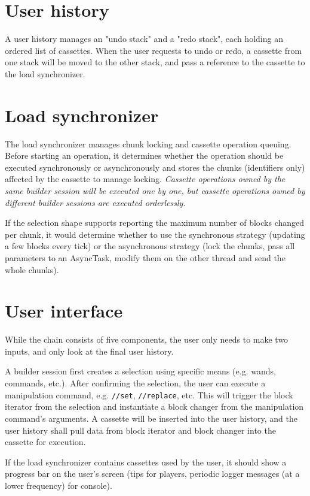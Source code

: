 \documentclass{article}
\begin{document}
			\section{User history}
				A user history manages an "undo stack" and a "redo stack", each holding an ordered list of cassettes.
				When the user requests to undo or redo, a cassette from one stack will be moved to the other stack, and
				pass a reference to the cassette to the load synchronizer.

			\section{Load synchronizer}
				The load synchronizer manages chunk locking and cassette operation queuing. Before starting an
				operation, it determines whether the operation should be executed synchronously or asynchronously and
				stores the chunks (identifiers only) affected by the cassette to manage locking. \emph{Cassette
				operations owned by the same builder session will be executed one by one, but cassette operations owned
				by different builder sessions are executed orderlessly.}

				If the selection shape supports reporting the maximum number of blocks changed per chunk, it would
				determine whether to use the synchronous strategy (updating a few blocks every tick) or the
				asynchronous strategy (lock the chunks, pass all parameters to an AsyncTask, modify them on the other
				thread and send the whole chunks).

			\section{User interface}
				While the chain consists of five components, the user only needs to make two inputs, and only look at
				the final user history.

				A builder session first creates a selection using specific means (e.g. wands, commands, etc.). After
				confirming the selection, the user can execute a manipulation command, e.g. \texttt{//set},
				\texttt{//replace}, etc. This will trigger the block iterator from the selection and instantiate a
				block changer from the manipulation command's arguments. A cassette will be inserted into the user
				history, and the user history shall pull data from block iterator and block changer into the cassette
				for execution.

				If the load synchronizer contains cassettes used by the user, it should show a progress bar on the
				user's screen (tips for players, periodic logger messages (at a lower frequency) for console).
\end{document}
